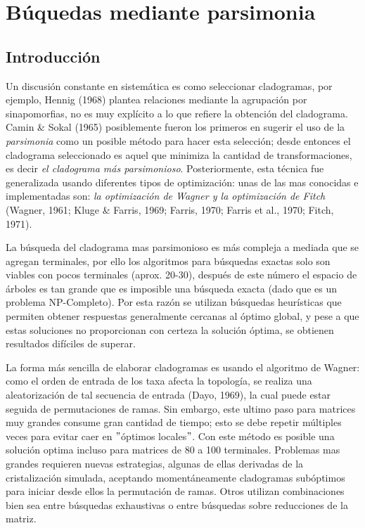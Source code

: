 
\chapter{B\'uquedas mediante parsimonia} %
\label{cha:parsimonia}

\section*{Introducci\'on} 

Un discusi\'on constante en sistem\'atica es como seleccionar cladogramas, por ejemplo, {\color{red}Hennig (1968)} plantea relaciones mediante la agrupaci\'on por sinapomorfias, no es muy expl\'icito a lo que refiere la obtenci\'on del cladograma. {\color{red}Camin \& Sokal (1965)} posiblemente fueron los primeros en sugerir el uso de la \textit{parsimonia} como un posible m\'etodo para hacer esta selecci\'on; desde entonces el cladograma seleccionado es aquel que minimiza la cantidad de transformaciones, es decir \textit{el cladograma m\'as parsimonioso}. Posteriormente, esta t\'ecnica fue generalizada usando diferentes tipos de optimizaci\'on: unas de las mas conocidas e implementadas son: \textit{la optimizaci\'on de Wagner y la optimizaci\'on de Fitch} {\color{red}(Wagner, 1961; Kluge \& Farris, 1969; Farris, 1970; Farris et al., 1970; Fitch, 1971)}.


La b\'usqueda del cladograma mas parsimonioso es m\'as compleja a mediada que se agregan terminales,  por ello los algoritmos para b\'usquedas exactas solo son viables con pocos terminales (aprox. 20-30),  despu\'es de este n\'umero el espacio de \'arboles es tan grande que es imposible una b\'usqueda exacta (dado que es un problema NP-Completo). Por esta raz\'on se utilizan b\'usquedas heur\'isticas que permiten obtener respuestas generalmente cercanas al \'optimo global,  y pese a que estas soluciones no proporcionan con certeza la soluci\'on \'optima, se obtienen resultados  dif\'iciles de superar.

La forma m\'as sencilla de elaborar cladogramas es usando el algoritmo de Wagner: como el orden de entrada de los taxa afecta la topolog\'ia,  se realiza una aleatorizaci\'on de tal secuencia de entrada {\color{red} (Dayo, 1969)},  la cual puede estar seguida de permutaciones de ramas. Sin embargo,  este ultimo paso para matrices muy grandes consume gran cantidad de tiempo; esto se debe repetir m\'ultiples veces para evitar caer en $"$\'optimos locales$"$. Con este m\'etodo es posible una soluci\'on optima incluso para matrices de 80 a 100 terminales. Problemas mas grandes requieren nuevas estrategias,  algunas de ellas derivadas de la cristalizaci\'on simulada,  aceptando moment\'aneamente cladogramas sub\'optimos para iniciar desde ellos la permutaci\'on de ramas. Otros utilizan combinaciones bien sea entre b\'usquedas exhaustivas o entre b\'usquedas sobre reducciones de la matriz.

